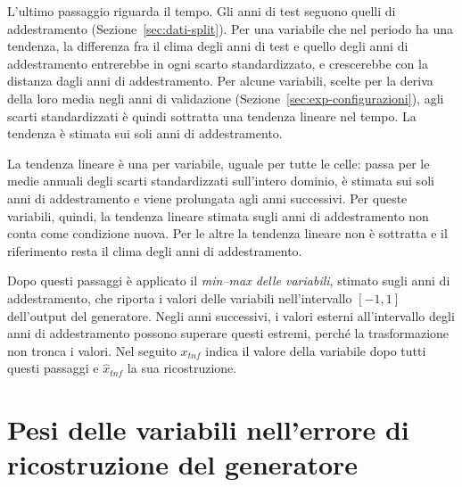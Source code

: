 L'ultimo passaggio riguarda il tempo. Gli anni di test seguono quelli di addestramento (Sezione~\ref{sec:dati-split}). Per una variabile che nel periodo ha una tendenza, la differenza fra il clima degli anni di test e quello degli anni di addestramento entrerebbe in ogni scarto standardizzato, e crescerebbe con la distanza dagli anni di addestramento. Per alcune variabili, scelte per la deriva della loro media negli anni di validazione (Sezione~\ref{sec:exp-configurazioni}), agli scarti standardizzati è quindi sottratta una tendenza lineare nel tempo. La tendenza è stimata sui soli anni di addestramento.

La tendenza lineare è una per variabile, uguale per tutte le celle: passa per le medie annuali degli scarti standardizzati sull'intero dominio, è stimata sui soli anni di addestramento e viene prolungata agli anni successivi. Per queste variabili, quindi, la tendenza lineare stimata sugli anni di addestramento non conta come condizione nuova. Per le altre la tendenza lineare non è sottratta e il riferimento resta il clima degli anni di addestramento.

Dopo questi passaggi è applicato il \emph{min--max delle variabili}, stimato sugli anni di addestramento, che riporta i valori delle variabili nell'intervallo $[-1,1]$ dell'output del generatore. Negli anni successivi, i valori esterni all'intervallo degli anni di addestramento possono superare questi estremi, perché la trasformazione non tronca i valori. Nel seguito $x_{tnf}$ indica il valore della variabile dopo tutti questi passaggi e $\hat{x}_{tnf}$ la sua ricostruzione.

\section{Pesi delle variabili nell'errore di ricostruzione del generatore}
\label{sec:pesi-variabili-ricostruzione}

